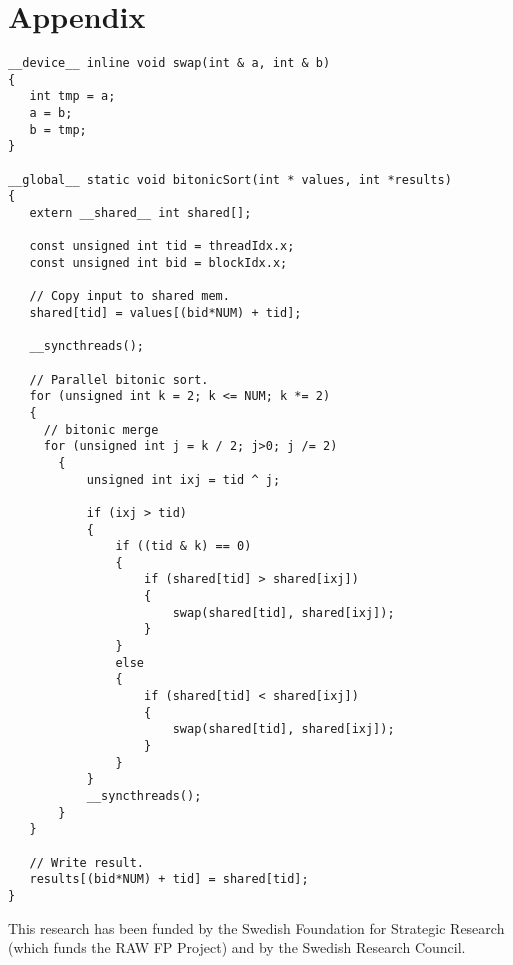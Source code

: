 \documentclass[]{sigplanconf}
\begin{document}
\section{Appendix}
\begin{codesize}
\begin{verbatim}
__device__ inline void swap(int & a, int & b)
{
   int tmp = a;
   a = b;
   b = tmp;
}

__global__ static void bitonicSort(int * values, int *results)
{
   extern __shared__ int shared[];

   const unsigned int tid = threadIdx.x;
   const unsigned int bid = blockIdx.x;

   // Copy input to shared mem.
   shared[tid] = values[(bid*NUM) + tid];

   __syncthreads();

   // Parallel bitonic sort.
   for (unsigned int k = 2; k <= NUM; k *= 2)
   { 
     // bitonic merge
     for (unsigned int j = k / 2; j>0; j /= 2)
       {
           unsigned int ixj = tid ^ j;

           if (ixj > tid)
           {
               if ((tid & k) == 0)
               {
                   if (shared[tid] > shared[ixj])
                   {
                       swap(shared[tid], shared[ixj]);
                   }
               }
               else
               {
                   if (shared[tid] < shared[ixj])
                   {
                       swap(shared[tid], shared[ixj]);
                   }
               }
           }
           __syncthreads();
       }
   }

   // Write result.
   results[(bid*NUM) + tid] = shared[tid];
}
\end{verbatim}
\end{codesize}





\acks
This research has been funded by the Swedish Foundation for Strategic Research (which funds
the RAW FP Project) and
by the Swedish Research Council.









\end{document}
